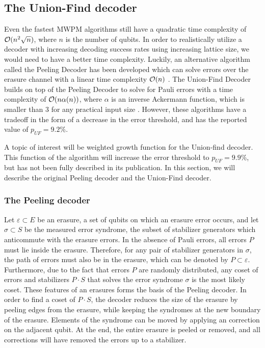 \subsection{The Union-Find decoder}\label{sec:UFdecoder}

Even the fastest MWPM algorithms still have a quadratic time complexity of $\mathcal{O}(n^2\sqrt{n})$, where $n$ is the number of qubits. In order to realistically utilize a decoder with increasing decoding success rates using increasing lattice size, we would need to have a better time complexity. Luckily, an alternative algorithm called the Peeling Decoder has been developed which can solve errors over the erasure channel with a linear time complexity $\mathcal{O}(n)$ \cite{delfosse2017linear}. The Union-Find Decoder builds on top of the Peeling Decoder to solve for Pauli errors with a time complexity of $\mathcal{O}(n\alpha(n))$, where $\alpha$ is an inverse Ackermann function, which is smaller than 3 for any practical input size \cite{delfosse2017almost}. However, these algorithms have a tradeoff in the form of a decrease in the error threshold, and has the reported value of $p_{UF} = 9.2\%$.

A topic of interest will be weighted growth function for the Union-find decoder. This function of the algorithm will increase the error threshold to $p_{UF} = 9.9\%$, but has not been fully described in its publication.  In this section, we will describe the original Peeling decoder and the Union-Find decoder.   \\

\subsubsection{The Peeling decoder}
Let $\varepsilon \subset E$ be an erasure, a set of qubits on which an erasure error occurs, and let $\sigma \subset S$ be the measured error syndrome, the subset of stabilizer generators which anticommute with the erasure errors. In the absence of Pauli errors, all errors $P$ must lie inside the erasure. Therefore, for any pair of stabilizer generators in $\sigma$, the path of errors must also be in the erasure, which can be denoted by $P\subset \varepsilon$. Furthermore, due to the fact that errors $P$ are randomly distributed, any coset of errors and stabilizers $P\cdot S$ that solves the error syndrome $\sigma$ is the most likely coset. These features of an erasures forms the basis of the Peeling decoder. In order to find a coset of $P \cdot S$, the decoder reduces the size of the erasure by peeling edges from the erasure, while keeping the syndromes at the new boundary of the erasure. Elements of the syndrome can be moved by applying an correction on the adjacent qubit. At the end, the entire erasure is peeled or removed, and all corrections will have removed the errors up to a stabilizer.


